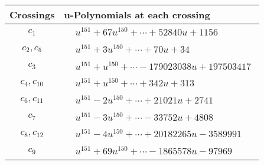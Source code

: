 \documentclass[1p]{elsarticle_modified}
\theoremstyle{definition}
\begin{document}
\begin{tabular}{m{50pt}|m{274pt}}
Crossings & \hspace{64pt}u-Polynomials at each crossing \\
\hline $$\begin{aligned}c_{1}\end{aligned}$$&$\begin{aligned}
&u^{151}+67 u^{150}+\cdots+52840 u+1156
\end{aligned}$\\
\hline $$\begin{aligned}c_{2},c_{5}\end{aligned}$$&$\begin{aligned}
&u^{151}+3 u^{150}+\cdots+70 u+34
\end{aligned}$\\
\hline $$\begin{aligned}c_{3}\end{aligned}$$&$\begin{aligned}
&u^{151}+u^{150}+\cdots-179023038 u+197503417
\end{aligned}$\\
\hline $$\begin{aligned}c_{4},c_{10}\end{aligned}$$&$\begin{aligned}
&u^{151}+u^{150}+\cdots+342 u+313
\end{aligned}$\\
\hline $$\begin{aligned}c_{6},c_{11}\end{aligned}$$&$\begin{aligned}
&u^{151}-2 u^{150}+\cdots+21021 u+2741
\end{aligned}$\\
\hline $$\begin{aligned}c_{7}\end{aligned}$$&$\begin{aligned}
&u^{151}-3 u^{150}+\cdots-33752 u+4808
\end{aligned}$\\
\hline $$\begin{aligned}c_{8},c_{12}\end{aligned}$$&$\begin{aligned}
&u^{151}-4 u^{150}+\cdots+20182265 u-3589991
\end{aligned}$\\
\hline $$\begin{aligned}c_{9}\end{aligned}$$&$\begin{aligned}
&u^{151}+69 u^{150}+\cdots-1865578 u-97969
\end{aligned}$\\
\hline
\end{tabular}\\~\\
\end{document}
